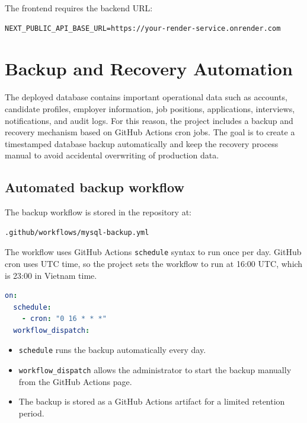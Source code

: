\documentclass[11pt,a4paper]{report}
\begin{document}
The frontend requires the backend URL:

\begin{lstlisting}[caption={Frontend environment variable}]
NEXT_PUBLIC_API_BASE_URL=https://your-render-service.onrender.com
\end{lstlisting}

\section{Backup and Recovery Automation}

The deployed database contains important operational data such as accounts, candidate profiles, employer information, job positions, applications, interviews, notifications, and audit logs. For this reason, the project includes a backup and recovery mechanism based on GitHub Actions cron jobs. The goal is to create a timestamped database backup automatically and keep the recovery process manual to avoid accidental overwriting of production data.

\subsection*{Automated backup workflow}

The backup workflow is stored in the repository at:

\begin{lstlisting}[caption={GitHub Actions backup workflow location}]
.github/workflows/mysql-backup.yml
\end{lstlisting}

The workflow uses GitHub Actions \texttt{schedule} syntax to run once per day. GitHub cron uses UTC time, so the project sets the workflow to run at 16:00 UTC, which is 23:00 in Vietnam time.

\begin{lstlisting}[language=yaml,caption={GitHub Actions cron schedule}]
on:
  schedule:
    - cron: "0 16 * * *"
  workflow_dispatch:
\end{lstlisting}

\begin{itemize}[leftmargin=1.2cm,itemsep=0.1em]
  \item \texttt{schedule} runs the backup automatically every day.
  \item \texttt{workflow\_dispatch} allows the administrator to start the backup manually from the GitHub Actions page.
  \item The backup is stored as a GitHub Actions artifact for a limited retention period.
\end{itemize}
\end{document}
